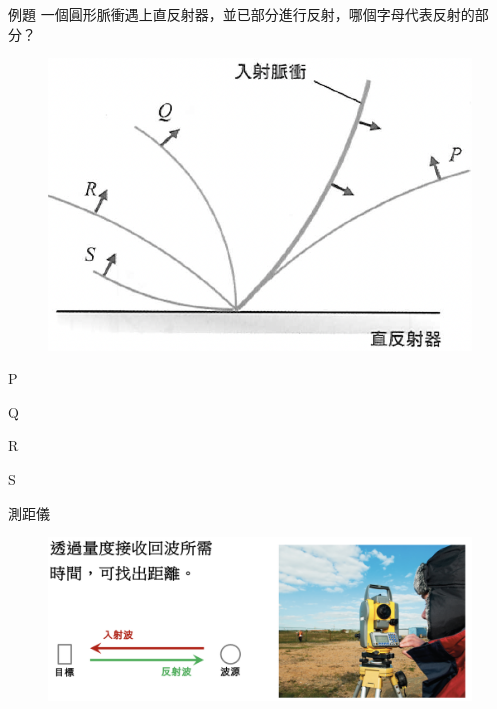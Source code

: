 \documentclass[13pt]{beamer}
\begin{document}
\begin{frame}{例題}
    一個圓形脈衝遇上直反射器，並已部分進行反射，哪個字母代表反射的部分？
    \begin{figure}
        \centering
        \includegraphics[width=0.5\linewidth]{images/Screenshot 2023-09-27 at 11.19.35 PM.png}


    \end{figure}
    \begin{mchoices}
        \begin{mmc}
            \item P
            \item Q
        \end{mmc}
        \begin{mmc}
            \item R
            \item S
        \end{mmc}
    \end{mchoices}
\end{frame}
\begin{frame}{測距儀}
    \begin{figure}
        \centering
        \includegraphics[width=1\linewidth]{images/Screenshot 2023-09-27 at 5.27.30 PM.png}


    \end{figure}
\end{frame}
\end{document}
